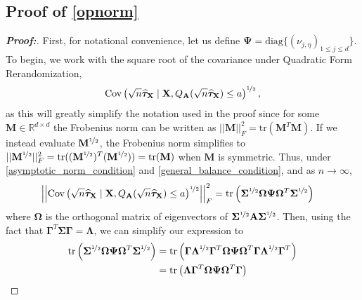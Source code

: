 \documentclass[11pt,twoside]{article}
\theoremstyle{definition}
\theoremstyle{remark}
\begin{document}
\subsection{Proof of \texorpdfstring{\cref{opnorm}}{Theorem 2}} \label{opnorm_proof}
\begin{proof}[\textbf{Proof:}]
First, for notational convenience, let us define $\mathbf{\Psi} = \text{diag}\{(\nu_{j, \eta})_{1 \leq j \leq d} \}$. To begin, we work with the square root of the covariance under Quadratic Form Rerandomization,
\begin{align*}
    \text{Cov}\left(\sqrt{n}\widehat{\bm{\tau}}_{\mathbf{X}} \mid \mathbf{X}, Q_{\mathbf{A}}(\sqrt{n} \widehat{\bm{\tau}}_{\mathbf{X}}) \leq a\right)^{\nicefrac{1}{2}},
\end{align*}
as this will greatly simplify the notation used in the proof since for some $\mathbf{M} \in \mathbb{R}^{d \times d}$ the Frobenius norm can be written as $|| \mathbf{M} ||^2_F = \text{tr}(\mathbf{M}^T \mathbf{M})$. If we instead evaluate $\mathbf{M}^{\nicefrac{1}{2}}$, the Frobenius norm simplifies to  $||\mathbf{M}^{\nicefrac{1}{2}} ||^2_F = \text{tr}((\mathbf{M}^{\nicefrac{1}{2}})^T (\mathbf{M}^{\nicefrac{1}{2}})) = \text{tr}(\mathbf{M})$ when $\mathbf{M}$ is symmetric. Thus, under \cref{asymptotic_norm_condition} and \cref{general_balance_condition}, and as $n \to \infty$,
\begin{align*}
     \left|\left|\text{Cov}\left(\sqrt{n}\widehat{\bm{\tau}}_{\mathbf{X}} \mid \mathbf{X}, Q_{\mathbf{A}}(\sqrt{n} \widehat{\bm{\tau}}_{\mathbf{X}}) \leq a\right)^{\nicefrac{1}{2}}\right|\right|^2_F &= \text{tr}\left(\mathbf{\Sigma}^{\nicefrac{1}{2}} \mathbf{\Omega} \mathbf{\Psi} \mathbf{\Omega}^T \mathbf{\Sigma}^{\nicefrac{1}{2}}  \right)
\end{align*}
where $\mathbf{\Omega}$ is the orthogonal matrix of eigenvectors of $\mathbf{\Sigma}^{\nicefrac{1}{2}} \mathbf{A} \mathbf{\Sigma}^{\nicefrac{1}{2}}$. Then, using the fact that $\mathbf{\Gamma}^T \mathbf{\Sigma} \mathbf{\Gamma} = \mathbf{\Lambda}$, we can simplify our expression to
\begin{align*}
    \text{tr}\left(\mathbf{\Sigma}^{\nicefrac{1}{2}} \mathbf{\Omega} \mathbf{\Psi} \mathbf{\Omega}^T \mathbf{\Sigma}^{\nicefrac{1}{2}}  \right) &= \text{tr}\left(\mathbf{\Gamma} \mathbf{\Lambda}^{\nicefrac{1}{2}} \mathbf{\Gamma}^T \mathbf{\Omega} \mathbf{\Psi} \mathbf{\Omega}^T \mathbf{\Gamma} \mathbf{\Lambda}^{\nicefrac{1}{2}} \mathbf{\Gamma}^T  \right) \\
    &= \text{tr}\left( \mathbf{\Lambda} \mathbf{\Gamma}^T \mathbf{\Omega} \mathbf{\Psi} \mathbf{\Omega}^T \mathbf{\Gamma}  \right) \\

\end{align*}
\end{proof}
\end{document}
